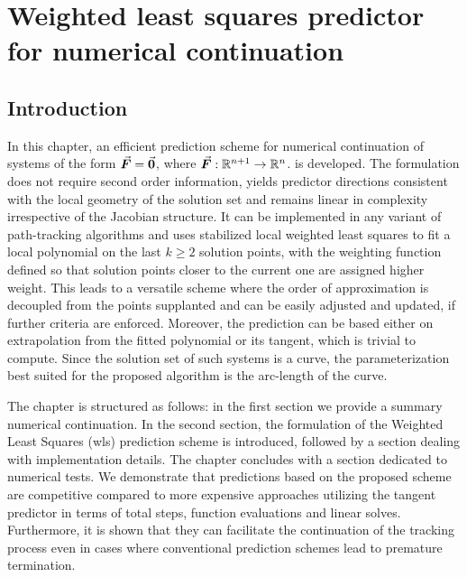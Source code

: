 \chapter{Weighted least squares predictor for numerical continuation}\label{CH5}

\section{Introduction}\label{CH5-S1}

In this chapter, an efficient prediction 
scheme for numerical continuation of systems of the form $\vec{\bm{F}}=\vec{\bm{0}}$, 
where $\vec{\bm{F}}:\mathbb{R}^{n+1}\rightarrow\mathbb{R}^n$. 
is developed. The formulation does not require second order information, yields 
predictor 
directions consistent with the local geometry of the solution set and remains 
linear in complexity irrespective of the Jacobian structure. It can be 
implemented in any variant of path-tracking algorithms and uses
stabilized local
weighted least squares to fit a local polynomial on the last $k\geq 2$ solution
points, with the weighting function defined so that solution points closer to
the current one are assigned higher weight. This leads to a
versatile scheme where the order of approximation is decoupled from the
points supplanted and can be easily adjusted and updated, if further criteria
are enforced. Moreover, the prediction can be based either on extrapolation 
from the fitted polynomial or its tangent, which is trivial to compute. Since
the solution set of such systems is a curve, the parameterization best suited
for the proposed algorithm is the arc-length of the curve. 

The chapter is structured as follows: in the first section we provide a summary 
numerical continuation. In the second section, the formulation of the Weighted 
Least Squares (\acrshort{wls}) prediction scheme is introduced, followed by a 
section dealing with implementation details. The chapter concludes with a 
section dedicated to numerical tests. We
demonstrate that predictions based on the proposed scheme are competitive
compared to more expensive approaches utilizing the tangent predictor in
terms of total steps, function evaluations and linear solves. Furthermore, it
is shown that they can facilitate the continuation of the tracking process 
even in cases where conventional prediction schemes lead to premature
termination. 


